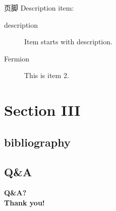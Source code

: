 \documentclass{beamer}
\begin{document}
\begin{frame}{页脚}
  Description item:
  \begin{description}%
  \item[description] Item starts with description.
  \item[Fermion] This is item 2.\parencite{kocher99}
  \end{description}
\end{frame}
\section{Section III}

\subsection*{bibliography}
    \frame[t,allowframebreaks]{
    \printbibliography
    }

\subsection*{Q\&A}
\begin{frame}
\begin{center}
    {\bf \Huge Q\&A?}\\
\pause
   {\bf \Huge Thank you!}
\end{center}
\end{frame}
\end{document}

